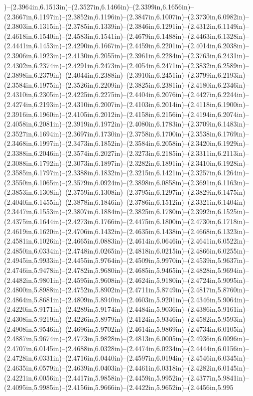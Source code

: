 )--(2.3964in,6.1513in)--(2.3527in,6.1466in)--(2.3399in,6.1656in)--(2.3667in,6.1197in)--(2.3852in,6.1196in)--(2.3847in,6.1007in)--(2.3730in,6.0982in)--(2.3803in,6.1315in)--(2.3785in,6.1339in)--(2.3846in,6.1291in)--(2.4312in,6.1149in)--(2.4618in,6.1540in)--(2.4583in,6.1541in)--(2.4679in,6.1488in)--(2.4463in,6.1328in)--(2.4441in,6.1453in)--(2.4290in,6.1667in)--(2.4459in,6.2201in)--(2.4014in,6.2038in)--(2.3906in,6.1923in)--(2.4130in,6.2055in)--(2.3961in,6.2284in)--(2.3763in,6.2431in)--(2.4302in,6.2374in)--(2.4291in,6.2473in)--(2.4054in,6.2471in)--(2.3832in,6.2589in)--(2.3898in,6.2379in)--(2.4044in,6.2388in)--(2.3910in,6.2451in)--(2.3799in,6.2193in)--(2.3584in,6.1975in)--(2.3526in,6.2209in)--(2.3825in,6.2381in)--(2.4180in,6.2346in)--(2.4310in,6.2305in)--(2.4225in,6.2275in)--(2.4404in,6.2076in)--(2.4427in,6.2244in)--(2.4274in,6.2193in)--(2.4310in,6.2007in)--(2.4103in,6.2014in)--(2.4118in,6.1900in)--(2.3916in,6.1960in)--(2.4105in,6.2012in)--(2.4158in,6.2156in)--(2.4194in,6.2074in)--(2.4058in,6.2081in)--(2.3919in,6.1972in)--(2.4080in,6.1783in)--(2.3709in,6.1483in)--(2.3527in,6.1694in)--(2.3697in,6.1730in)--(2.3758in,6.1700in)--(2.3538in,6.1769in)--(2.3468in,6.1997in)--(2.3473in,6.1852in)--(2.3584in,6.2058in)--(2.3420in,6.1929in)--(2.3388in,6.2046in)--(2.3574in,6.2027in)--(2.3273in,6.2185in)--(2.3311in,6.2113in)--(2.3088in,6.1792in)--(2.3073in,6.1897in)--(2.3282in,6.1891in)--(2.3410in,6.1928in)--(2.3585in,6.1797in)--(2.3388in,6.1832in)--(2.3215in,6.1421in)--(2.3257in,6.1264in)--(2.3550in,6.1065in)--(2.3579in,6.0924in)--(2.3898in,6.0858in)--(2.3691in,6.1163in)--(2.3853in,6.1308in)--(2.3759in,6.1308in)--(2.3795in,6.1297in)--(2.3829in,6.1475in)--(2.4040in,6.1455in)--(2.3878in,6.1846in)--(2.3786in,6.1512in)--(2.3321in,6.1404in)--(2.3447in,6.1553in)--(2.3807in,6.1884in)--(2.3825in,6.1780in)--(2.3992in,6.1525in)--(2.4375in,6.1644in)--(2.4273in,6.1766in)--(2.4475in,6.1800in)--(2.4730in,6.1718in)--(2.4619in,6.1620in)--(2.4706in,6.1432in)--(2.4635in,6.1438in)--(2.4668in,6.1323in)--(2.4581in,6.1026in)--(2.4665in,6.0883in)--(2.4614in,6.0646in)--(2.4641in,6.0522in)--(2.4850in,6.0334in)--(2.4748in,6.0265in)--(2.4818in,6.0215in)--(2.4866in,6.0255in)--(2.4945in,5.9933in)--(2.4455in,5.9764in)--(2.4509in,5.9970in)--(2.4539in,5.9637in)--(2.4746in,5.9478in)--(2.4782in,5.9680in)--(2.4685in,5.9465in)--(2.4828in,5.9694in)--(2.4482in,5.9801in)--(2.4595in,5.9608in)--(2.4624in,5.9180in)--(2.4724in,5.9095in)--(2.4800in,5.8988in)--(2.4752in,5.8902in)--(2.4711in,5.8749in)--(2.4817in,5.8760in)--(2.4864in,5.8681in)--(2.4809in,5.8940in)--(2.4603in,5.9201in)--(2.4346in,5.9064in)--(2.4220in,5.9171in)--(2.4289in,5.9174in)--(2.4484in,5.9036in)--(2.4386in,5.9161in)--(2.4308in,5.9219in)--(2.4226in,5.8979in)--(2.4124in,5.9346in)--(2.4582in,5.9593in)--(2.4908in,5.9546in)--(2.4696in,5.9702in)--(2.4614in,5.9869in)--(2.4734in,6.0105in)--(2.4887in,5.9674in)--(2.4773in,5.9828in)--(2.4813in,6.0005in)--(2.4936in,6.0096in)--(2.4707in,6.0145in)--(2.4688in,6.0328in)--(2.4474in,6.0234in)--(2.4444in,6.0156in)--(2.4728in,6.0331in)--(2.4716in,6.0440in)--(2.4597in,6.0194in)--(2.4546in,6.0345in)--(2.4635in,6.0579in)--(2.4639in,6.0403in)--(2.4461in,6.0318in)--(2.4282in,6.0145in)--(2.4221in,6.0056in)--(2.4417in,5.9858in)--(2.4459in,5.9952in)--(2.4377in,5.9841in)--(2.4095in,5.9985in)--(2.4156in,5.9666in)--(2.4422in,5.9652in)--(2.4456in,5.995